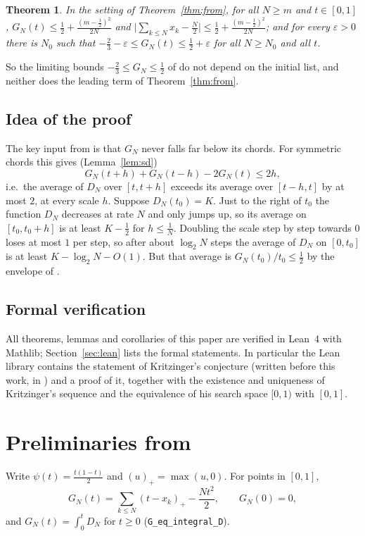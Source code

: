 \documentclass[11pt]{amsart}
\newtheorem{theorem}{Theorem}
\theoremstyle{remark}
\newcommand{\lean}[1]{\texttt{\small #1}}
\begin{document}
\begin{theorem}\label{thm:universal}
In the setting of Theorem~\ref{thm:from}, for all $N\ge m$ and $t\in[0,1]$,
$G_N(t)\le\frac12+\frac{(m-\frac12)^2}{2N}$ and
$\bigl|\sum_{k\le N}x_k-\frac N2\bigr|\le\frac12+\frac{(m-\frac12)^2}{2N}$; and
for every $\varepsilon>0$ there is $N_0$ such that
$-\frac23-\varepsilon\le G_N(t)\le\frac12+\varepsilon$ for all $N\ge N_0$ and all $t$.
\end{theorem}

So the limiting bounds $-\frac23\le G_N\le\frac12$ of \cite{Den} do not depend on
the initial list, and neither does the leading term of Theorem~\ref{thm:from}.

\subsection*{Idea of the proof}
The key input from \cite{Den} is that $G_N$ never falls far below its chords. For
symmetric chords this gives (Lemma~\ref{lem:sd})
\[
G_N(t+h)+G_N(t-h)-2G_N(t)\le2h ,
\]
i.e.\ the average of $D_N$ over $[t,t+h]$ exceeds its average over $[t-h,t]$ by
at most $2$, at every scale $h$. Suppose $D_N(t_0)=K$. Just to the right of $t_0$
the function $D_N$ decreases at rate $N$ and only jumps up, so its average on
$[t_0,t_0+h]$ is at least $K-\frac12$ for $h\le\frac1N$. Doubling the scale step
by step towards $0$ loses at most $1$ per step, so after about $\log_2N$ steps the
average of $D_N$ on $[0,t_0]$ is at least $K-\log_2N-O(1)$. But that average is
$G_N(t_0)/t_0\le\frac12$ by the envelope of \cite{Den}.

\subsection*{Formal verification}
All theorems, lemmas and corollaries of this paper are verified in Lean~4 with
Mathlib; Section~\ref{sec:lean} lists the formal statements. In particular the
Lean library contains the statement of Kritzinger's conjecture (written before
this work, in \cite{Den}) and a proof of it, together with the existence and
uniqueness of Kritzinger's sequence and the equivalence of his search space
$[0,1)$ with $[0,1]$.

\section{Preliminaries from \texorpdfstring{\cite{Den}}{[Den]}}

Write $\psi(t)=\frac{t(1-t)}2$ and $(u)_+=\max(u,0)$. For points in $[0,1]$,
\[
G_N(t)=\sum_{k\le N}(t-x_k)_+-\frac{Nt^2}2,\qquad G_N(0)=0 ,
\]
and $G_N(t)=\int_0^tD_N$ for $t\ge0$ (\lean{G\_eq\_integral\_D}).
\end{document}
